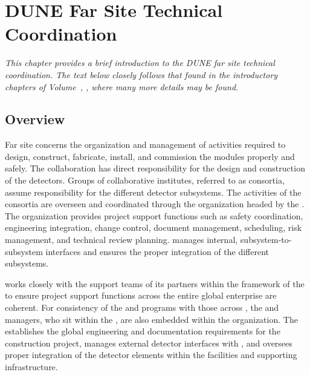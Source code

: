\chapter{DUNE Far Site Technical Coordination}
\label{ch:exec-tc}

\textit{This chapter provides a brief introduction to the DUNE far site technical coordination.  The text below closely follows that found in the introductory chapters of Volume~\volnumbertc{}, \voltitletc{}, where many more details may be found.}

\section{Overview}

Far site  concerns the organization and management of 
activities required to design, construct,
fabricate, install, and commission the   modules properly and safely. 
      The  collaboration has direct responsibility for the design 
and construction of the  detectors.  Groups of collaborative 
institutes, referred to as consortia, assume responsibility for 
the different detector subsystems.  The activities of the consortia are 
overseen and coordinated through the   organization 
headed by the  .  The  organization 
provides project support functions such as safety coordination, 
engineering integration, change control, document management, scheduling, 
risk management, and technical review planning.    
manages internal, subsystem-to-subsystem interfaces and ensures the proper integration of the different subsystems.   

  works closely with the support teams of its 
 partners within the framework of the  to 
ensure project support functions across the entire global 
enterprise are coherent.  For consistency of the   
and  programs with those across , the 
  and  managers, who sit within 
the , are also embedded within the   
organization.  The  establishes the global engineering
and documentation requirements for the  
 construction project, manages external  detector 
interfaces with , and oversees proper 
integration of the  detector elements within the facilities 
and supporting infrastructure.  

